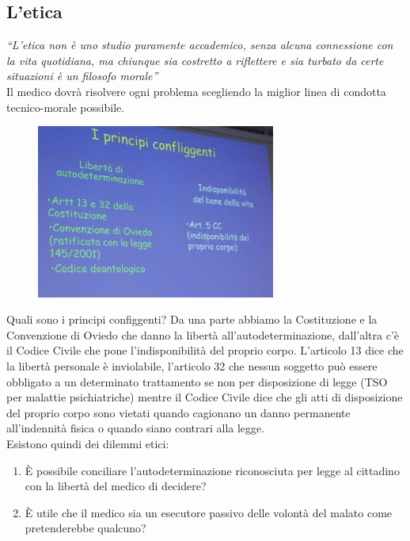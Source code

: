 \subsection{L'etica}


\emph{``L'etica non è uno studio puramente accademico, senza alcuna
connessione con la vita quotidiana, ma chiunque sia costretto a
riflettere e sia turbato da certe situazioni è un filosofo morale''}
\\
Il medico dovrà risolvere ogni problema scegliendo la miglior linea di
condotta tecnico-morale possibile.

\begin{figure}[!ht]
\centering
	\includegraphics[width=0.7\textwidth]{34/image10.jpeg}
	\end{figure}

Quali sono i principi configgenti? Da una parte abbiamo la Costituzione
e la Convenzione di Oviedo che danno la libertà all'autodeterminazione,
dall'altra c'è il Codice Civile che pone l'indisponibilità del proprio
corpo. L'articolo 13 dice che la libertà personale è inviolabile,
l'articolo 32 che nessun soggetto può essere obbligato a un determinato
trattamento se non per disposizione di legge (TSO per malattie
psichiatriche) mentre il Codice Civile dice che gli atti di disposizione
del proprio corpo sono vietati quando cagionano un danno permanente
all'indennità fisica o quando siano contrari alla legge.
\\
Esistono quindi dei dilemmi etici:

\begin{enumerate}
\def\labelenumi{\arabic{enumi})}
\item
  È possibile conciliare l'autodeterminazione riconosciuta per legge al
  cittadino con la libertà del medico di decidere?
\item
  È utile che il medico sia un esecutore passivo delle volontà del
  malato come pretenderebbe qualcuno?
\end{enumerate}

